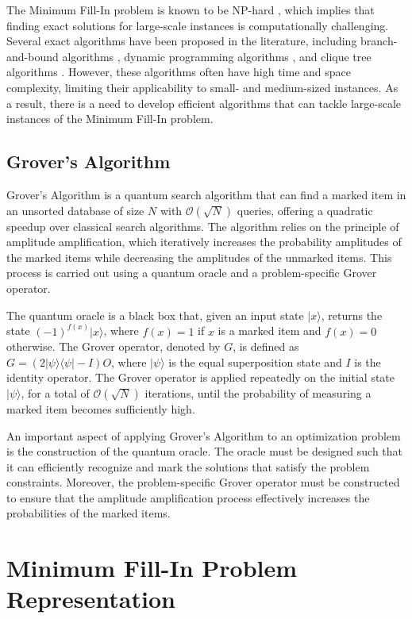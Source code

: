 The Minimum Fill-In problem is known to be NP-hard \cite{yannakakis1981computing}, which implies that finding exact solutions for large-scale instances is computationally challenging. Several exact algorithms have been proposed in the literature, including branch-and-bound algorithms \cite{leconte1999new}, dynamic programming algorithms \cite{tarjan1985simple}, and clique tree algorithms \cite{rose1972graph}. However, these algorithms often have high time and space complexity, limiting their applicability to small- and medium-sized instances. As a result, there is a need to develop efficient algorithms that can tackle large-scale instances of the Minimum Fill-In problem.

\subsection{Grover's Algorithm}

Grover's Algorithm \cite{grover1996fast} is a quantum search algorithm that can find a marked item in an unsorted database of size $N$ with $\mathcal{O}(\sqrt{N})$ queries, offering a quadratic speedup over classical search algorithms. The algorithm relies on the principle of amplitude amplification, which iteratively increases the probability amplitudes of the marked items while decreasing the amplitudes of the unmarked items. This process is carried out using a quantum oracle and a problem-specific Grover operator.

The quantum oracle is a black box that, given an input state $|x\rangle$, returns the state $(-1)^{f(x)}|x\rangle$, where $f(x) = 1$ if $x$ is a marked item and $f(x) = 0$ otherwise. The Grover operator, denoted by $G$, is defined as $G = (2|\psi\rangle\langle\psi| - I)O$, where $|\psi\rangle$ is the equal superposition state and $I$ is the identity operator. The Grover operator is applied repeatedly on the initial state $|\psi\rangle$, for a total of $\mathcal{O}(\sqrt{N})$ iterations, until the probability of measuring a marked item becomes sufficiently high.

An important aspect of applying Grover's Algorithm to an optimization problem is the construction of the quantum oracle. The oracle must be designed such that it can efficiently recognize and mark the solutions that satisfy the problem constraints. Moreover, the problem-specific Grover operator must be constructed to ensure that the amplitude amplification process effectively increases the probabilities of the marked items.

\section{Minimum Fill-In Problem Representation}

